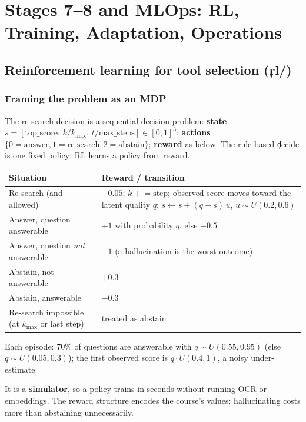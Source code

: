 \chapter{Stages 7--8 and MLOps: RL, Training, Adaptation, Operations}\label{ch:rl}
\section{Reinforcement learning for tool selection (\c{rl/})}
\subsection{Framing the problem as an MDP}
The re-search decision is a sequential decision problem: \textbf{state} $s=[\text{top\_score},\,k/k_{\max},\,t/\text{max\_steps}]\in[0,1]^3$; \textbf{actions} $\{0{=}\text{answer},1{=}\text{re-search},2{=}\text{abstain}\}$; \textbf{reward} as below. The rule-based \c{decide} is one fixed policy; RL learns a policy from reward.
\begin{longtable}{@{}p{5.2cm}p{9.3cm}@{}}\toprule Situation & Reward / transition \\ \midrule \endhead
Re-search (and allowed) & $-0.05$; $k\mathrel{+}=\text{step}$; observed score moves toward the latent quality $q$: $s\leftarrow s+(q-s)\,u$, $u\sim U(0.2,0.6)$ \\
Answer, question answerable & $+1$ with probability $q$, else $-0.5$ \\
Answer, question \emph{not} answerable & $-1$ (a hallucination is the worst outcome) \\
Abstain, not answerable & $+0.3$ \\
Abstain, answerable & $-0.3$ \\
Re-search impossible (at $k_{\max}$ or last step) & treated as abstain \\ \bottomrule\end{longtable}
Each episode: 70\% of questions are answerable with $q\sim U(0.55,0.95)$ (else $q\sim U(0.05,0.3)$); the first observed score is $q\cdot U(0.4,1)$, a noisy under-estimate.
\begin{why}It is a \textbf{simulator}, so a policy trains in seconds without running OCR or embeddings. The reward structure encodes the course's values: hallucinating costs more than abstaining unnecessarily.\end{why}
